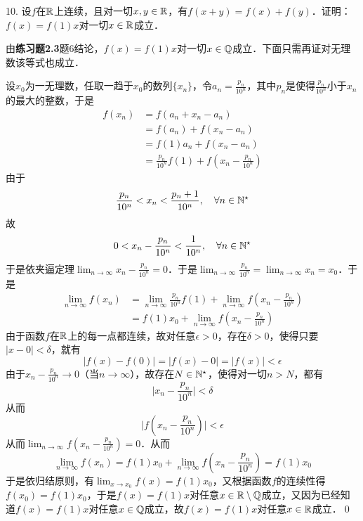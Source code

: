 10. 设$f$在$\mathbb{R}$上连续，且对一切$x,y \in \mathbb{R}$，有$f(x+y)=f(x)+f(y)$．证明：$f(x)=f(1)x$对一切$x \in \mathbb{R}$成立．\bigskip

\prove 由\textbf{练习题2.3}题6结论，$f(x) = f(1)x$对一切$x \in \mathbb{Q}$成立．下面只需再证对无理数该等式也成立．

\medskip
设$x_0$为一无理数，任取一趋于$x_0$的数列$\{x_n\}$，令$a_n = \displaystyle\frac{p_n}{10^n}$，其中$p_n$是使得$\displaystyle\frac{p_n}{10^n}$小于$x_n$的最大的整数，于是
\begin{align}
    f(x_n) &= f(a_n + x_n - a_n) \\
    &= f(a_n) + f(x_n-a_n) \\
    &= f(1)a_n + f(x_n-a_n) \\
    &= \frac{p_n}{10^n} f(1) + f(x_n - \displaystyle\frac{p_n}{10^n})
\end{align}
由于
\begin{equation}
    \displaystyle\frac{p_n}{10^n} < x_n < \displaystyle\frac{p_n+1}{10^n}, \quad \forall n \in \mathbb{N}^\star
\end{equation}
故
\begin{equation}
    0 < x_n - \displaystyle\frac{p_n}{10^n} < \frac{1}{10^n}, \quad \forall n \in \mathbb{N}^\star
\end{equation}
于是依夹逼定理$\displaystyle\lim_{n \to \infty} x_n - \displaystyle\frac{p_n}{10^n} = 0$．于是$\displaystyle\lim_{n \to \infty} \displaystyle\frac{p_n}{10^n} = \displaystyle\lim_{n \to \infty} x_n = x_0$．于是
\begin{align}
    \lim_{n \to \infty} f(x_n) &= \lim_{n \to \infty} \frac{p_n}{10^n} f(1) + \lim_{n \to \infty} f(x_n - \displaystyle\frac{p_n}{10^n}) \\
    &= f(1) x_0 + \displaystyle\lim_{n \to \infty} f(x_n - \displaystyle\frac{p_n}{10^n})
\end{align}
由于函数$f$在$\mathbb{R}$上的每一点都连续，故对任意$\epsilon > 0$，存在$\delta > 0$，使得只要$\lvert x - 0 \rvert < \delta$，就有
\begin{equation}
    \lvert f(x) - f(0) \rvert  = \lvert f(x) - 0 \rvert = \lvert f(x) \rvert < \epsilon
\end{equation}
由于$x_n - \displaystyle\frac{p_n}{10^n} \to 0$（当$n \to \infty$），故存在$N \in \mathbb{N}^\star$，使得对一切$n > N$，都有
\begin{equation}
    \lvert x_n - \frac{p_n}{10^n} \rvert < \delta
\end{equation}
从而
\begin{equation}
    \lvert f(x_n - \displaystyle\frac{p_n}{10^n}) \rvert < \epsilon
\end{equation}
从而$\displaystyle\lim_{n \to \infty} f(x_n - \displaystyle\frac{p_n}{10^n}) = 0$．从而
\begin{equation}
    \lim_{n \to \infty} f(x_n) = f(1) x_0 + \lim_{n \to \infty} f(x_n - \displaystyle\frac{p_n}{10^n}) = f(1)x_0
\end{equation}
于是依归结原则，有$\displaystyle\lim_{x \to x_0} f(x) = f(1)x_0$，又根据函数$f$的连续性得$f(x_0) = f(1)x_0$，于是$f(x) =f(1)x$对任意$x \in \mathbb{R} \setminus \mathbb{Q}$成立，又因为已经知道$f(x) = f(1)x$对任意$x \in \mathbb{Q}$成立，故$f(x) = f(1)x$对任意$x \in \mathbb{R}$成立．\qed\bigskip